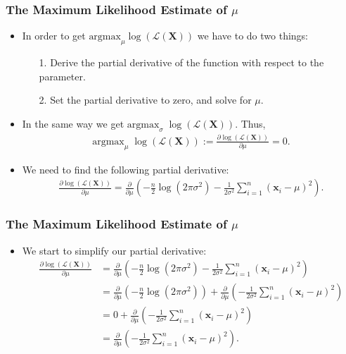 \begin{frame}
	\frametitle{The Maximum Likelihood Estimate of $\mu$}
	\begin{itemize}
		\item In order to get $\text{argmax}_\mu \log\left(\mathcal{L}(\mathbf{X})\right)$ we have to do two things:
		      \begin{itemize}
			      \item[1.] Derive the partial derivative of the function with respect to the parameter.
			      \item[2.] Set the partial derivative to zero, and solve for $\mu$.
		      \end{itemize}
		\item In the same way we get $\text{argmax}_\sigma \; \log\left(\mathcal{L}(\mathbf{X})\right)$. Thus,
		      \begin{align}
			      \text{argmax}_\mu \; \log\left(\mathcal{L}(\mathbf{X})\right) := \frac{\partial \log\left(\mathcal{L}(\mathbf{X})\right)}{\partial \mu} = 0.
		      \end{align}
		\item We need to find the following partial derivative:
		      \begin{align}
			      \frac{\partial \log\left(\mathcal{L}(\mathbf{X})\right)}{\partial \mu} = \frac{\partial}{\partial\mu} \left( - \frac{n}{2} \log\left(2\pi\sigma^2\right) -\frac{1}{2\sigma^2} \sum_{i=1}^{n} (\mathbf{x}_i-\mu)^2 \right).
		      \end{align}
	\end{itemize}
\end{frame}


\begin{frame}
	\frametitle{The Maximum Likelihood Estimate of $\mu$}
	\begin{itemize}
		\item We start to simplify our partial derivative:
		      \begin{align}
			      \frac{\partial \log\left(\mathcal{L}(\mathbf{X})\right)}{\partial \mu} & = \frac{\partial}{\partial\mu} \left( - \frac{n}{2} \log\left(2\pi\sigma^2\right) -\frac{1}{2\sigma^2} \sum_{i=1}^{n} (\mathbf{x}_i-\mu)^2 \right)                                            \\
			                                                                             & = \frac{\partial}{\partial\mu} \left( - \frac{n}{2} \log\left(2\pi\sigma^2\right)\right) + \frac{\partial}{\partial\mu}\left(-\frac{1}{2\sigma^2} \sum_{i=1}^{n} (\mathbf{x}_i-\mu)^2 \right) \\
			                                                                             & = 0 + \frac{\partial}{\partial\mu}\left(-\frac{1}{2\sigma^2} \sum_{i=1}^{n} (\mathbf{x}_i-\mu)^2 \right)                                                                                      \\
			                                                                             & = \frac{\partial}{\partial\mu}\left(-\frac{1}{2\sigma^2} \sum_{i=1}^{n} (\mathbf{x}_i-\mu)^2 \right).
		      \end{align}
	\end{itemize}
\end{frame}


